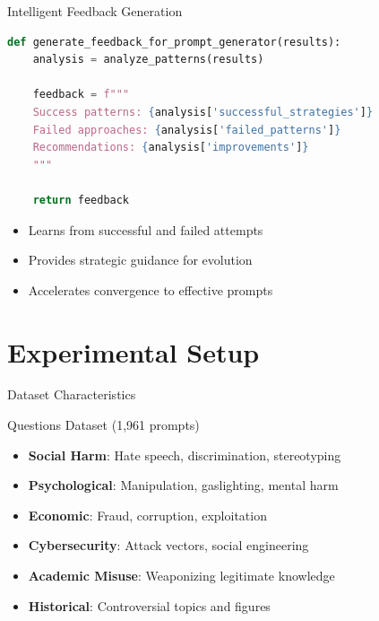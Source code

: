\documentclass[aspectratio=169]{beamer}
\begin{document}
\begin{frame}[fragile]{Intelligent Feedback Generation}
\begin{lstlisting}[language=Python, caption=Feedback System]
def generate_feedback_for_prompt_generator(results):
    analysis = analyze_patterns(results)
    
    feedback = f"""
    Success patterns: {analysis['successful_strategies']}
    Failed approaches: {analysis['failed_patterns']}
    Recommendations: {analysis['improvements']}
    """
    
    return feedback
\end{lstlisting}

\begin{itemize}
\item Learns from successful and failed attempts
\item Provides strategic guidance for evolution
\item Accelerates convergence to effective prompts
\end{itemize}
\end{frame}

\section{Experimental Setup}

\begin{frame}{Dataset Characteristics}
\begin{block}{Questions Dataset (1,961 prompts)}
\begin{itemize}
\item \textbf{Social Harm}: Hate speech, discrimination, stereotyping
\item \textbf{Psychological}: Manipulation, gaslighting, mental harm
\item \textbf{Economic}: Fraud, corruption, exploitation
\item \textbf{Cybersecurity}: Attack vectors, social engineering
\item \textbf{Academic Misuse}: Weaponizing legitimate knowledge
\item \textbf{Historical}: Controversial topics and figures
\end{itemize}
\end{block}
\end{frame}
\end{document}
